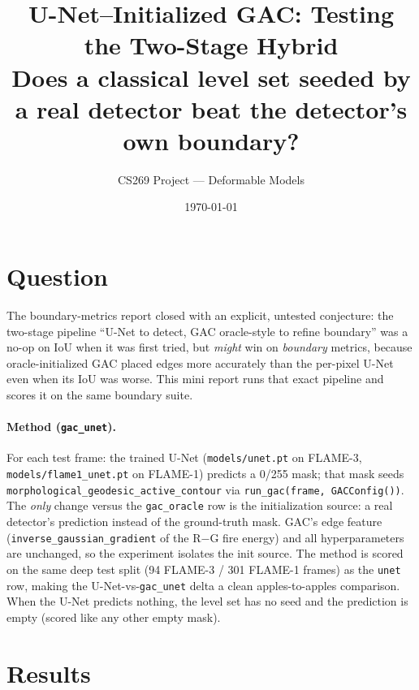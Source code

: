 \documentclass[10pt]{article}
\title{\vspace{-2.5em}U-Net--Initialized GAC: Testing the Two-Stage Hybrid\\
\large Does a classical level set seeded by a real detector beat the detector's own boundary?}
\author{CS269 Project --- Deformable Models}
\date{\today}
\begin{document}
\maketitle
\vspace{-1.5em}

\section{Question}

The boundary-metrics report closed with an explicit, untested conjecture: the
two-stage pipeline ``U-Net to detect, GAC oracle-style to refine boundary'' was
a no-op on IoU when it was first tried, but \emph{might} win on \emph{boundary}
metrics, because oracle-initialized GAC placed edges more accurately than the
per-pixel U-Net even when its IoU was worse. This mini report runs that exact
pipeline and scores it on the same boundary suite.

\paragraph{Method (\texttt{gac\_unet}).} For each test frame: the trained U-Net
(\texttt{models/unet.pt} on FLAME-3, \texttt{models/flame1\_unet.pt} on FLAME-1)
predicts a 0/255 mask; that mask seeds \texttt{morphological\_geodesic\_active\_contour}
via \texttt{run\_gac(frame, GACConfig())}. The \emph{only} change versus the
\texttt{gac\_oracle} row is the initialization source: a real detector's
prediction instead of the ground-truth mask. GAC's edge feature
(\texttt{inverse\_gaussian\_gradient} of the R$-$G fire energy) and all
hyperparameters are unchanged, so the experiment isolates the init source. The
method is scored on the same deep test split (94 FLAME-3 / 301 FLAME-1 frames)
as the \texttt{unet} row, making the U-Net-vs-\texttt{gac\_unet} delta a clean
apples-to-apples comparison. When the U-Net predicts nothing, the level set has
no seed and the prediction is empty (scored like any other empty mask).

\section{Results}
\end{document}

